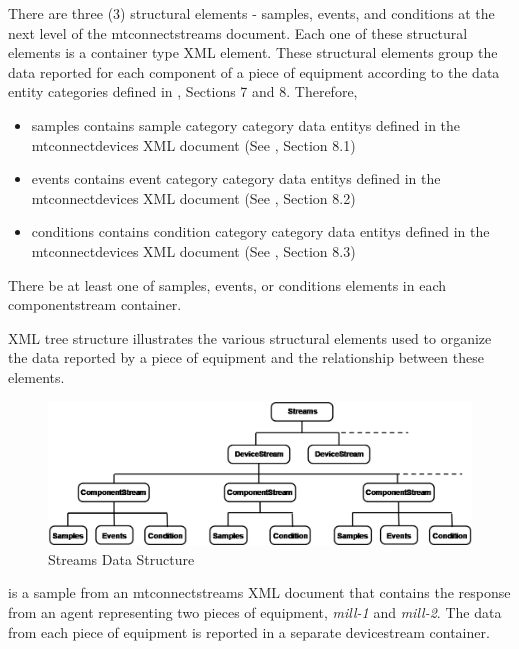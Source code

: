 \documentclass{mtconnect}	%
\begin{document}
There are three (3) \glspl{structural element} - \gls{samples}, \gls{events}, and \gls{conditions} at the next level of the \gls{mtconnectstreams} document.  Each one of these \glspl{structural element} is a container type XML element.  These \glspl{structural element} group the data reported for each component of a piece of equipment according to the \gls{data entity} categories defined in , Sections 7 and 8.  Therefore,

\begin{itemize}

\item \gls{samples} contains \gls{sample category} category \glspl{data entity} defined in the \gls{mtconnectdevices} XML document (See , Section 8.1)

\item \gls{events} contains \gls{event category} category \glspl{data entity} defined in the \gls{mtconnectdevices} XML document (See , Section 8.2)

\item \gls{conditions} contains \gls{condition category} category \glspl{data entity} defined in the \gls{mtconnectdevices} XML document (See , Section 8.3)
\end{itemize}

There \must be at least one of \gls{samples}, \gls{events}, or \gls{conditions} elements in each \gls{componentstream} container. 

 XML tree structure illustrates the various \glspl{structural element} used to organize the data reported by a piece of equipment and the relationship between these elements. 

\begin{figure}[ht]
  \centering
  \includegraphics[width=1.0\textwidth]{figures/streams-data-structure.png}
  \caption{Streams Data Structure}
  \label{fig:streams-data-structure}
\end{figure}

 is a sample from an \gls{mtconnectstreams} XML document that contains the response from an \gls{agent} representing two pieces of equipment, \textit{mill-1} and \textit{mill-2}. The data from each piece of equipment is reported in a separate \gls{devicestream} container. 
\end{document}
